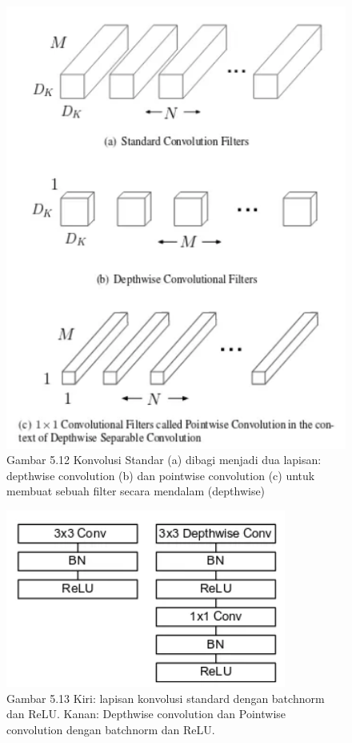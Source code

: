 \documentclass[
  letterpaper,
  DIV=11,
  numbers=noendperiod]{scrreprt}
\begin{document}
\begin{figure}

{\centering \includegraphics{Asset/mobilenet1.png}

}

\caption{Gambar 5.12 Konvolusi Standar (a) dibagi menjadi dua lapisan:
depthwise convolution (b) dan pointwise convolution (c) untuk membuat
sebuah filter secara mendalam (depthwise)}

\end{figure}

\begin{figure}

{\centering \includegraphics{Asset/mobilenet2.png}

}

\caption{Gambar 5.13 Kiri: lapisan konvolusi standard dengan batchnorm
dan ReLU. Kanan: Depthwise convolution dan Pointwise convolution dengan
batchnorm dan ReLU.}

\end{figure}
\end{document}
